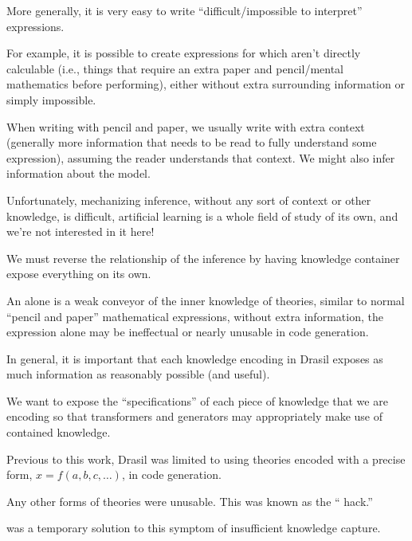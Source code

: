 More generally, it is very easy to write ``difficult/impossible to interpret''
expressions.

For example, it is possible to create expressions for which aren't directly
calculable (i.e., things that require an extra paper and pencil/mental
mathematics before performing), either without extra surrounding information or
simply impossible.







When writing with pencil and paper, we usually write with extra context
(generally more information that needs to be read to fully understand some
expression), assuming the reader understands that context. We might also infer
information about the model.

Unfortunately, mechanizing inference, without any sort of context or other
knowledge, is difficult, artificial learning is a whole field of study of its
own, and we're not interested in it here!

We must reverse the relationship of the inference by having knowledge container
expose everything on its own.




An \Expr{} alone is a weak conveyor of the inner knowledge of theories, similar
to normal ``pencil and paper'' mathematical expressions, without extra
information, the expression alone may be ineffectual or nearly unusable in code
generation.






In general, it is important that each knowledge encoding in Drasil exposes as
much information as reasonably possible (and useful).

We want to expose the ``specifications'' of each piece of knowledge that we are
encoding so that transformers and generators may appropriately make use of
contained knowledge.

Previous to this work, Drasil was limited to using theories encoded with a
precise form, \(x = f(a, b, c, \ldots{})\), in code generation.

Any other forms of theories were unusable. This was known as the ``\relToQD{}
hack.''






\originalRelToQDHaskell{}

 was a temporary solution to this symptom of
insufficient knowledge capture.

